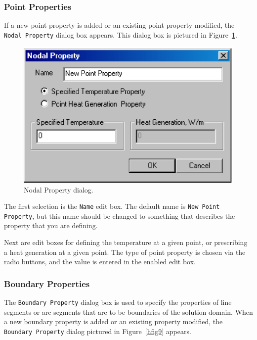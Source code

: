 \subsubsection{Point Properties}

If a new point property is added or an existing point property modified, the
\texttt{Nodal Property} dialog box appears. This dialog box is pictured in
Figure~\ref{hfig8}.

\begin{figure}[htbp]
\centerline{\includegraphics{hnodeprop.ps}}
\caption{Nodal Property dialog.}
\label{hfig8}
\end{figure}

The first selection is the \texttt{Name} edit box. The default name
is {\tt New Point Property}, but this name should be changed to
something that describes the property that you are defining.

Next are edit boxes for defining the temperature at a given point, or
prescribing a heat generation at a given point. The type of point
property is chosen via the radio buttons, and the value is entered in the
enabled edit box.

\subsubsection{Boundary Properties}

The \texttt{Boundary Property} dialog box is used to specify the
properties of line segments or arc segments that are to be
boundaries of the solution domain. When a new boundary property is
added or an existing property modified, the \texttt{Boundary
Property} dialog pictured in Figure~\ref{hfig9} appears.

